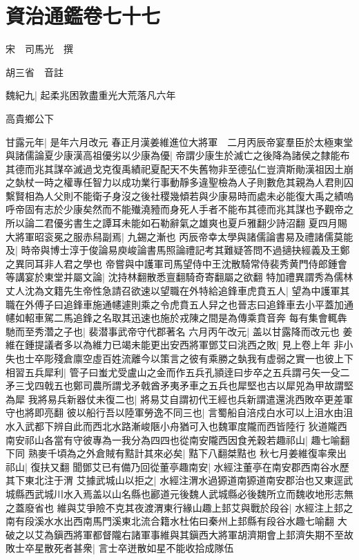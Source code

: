 \chapter{資治通鑑卷七十七}
宋　司馬光　撰

胡三省　音註

魏紀九|{
	起柔兆困敦盡重光大荒落凡六年}


高貴鄉公下

甘露元年|{
	是年六月改元}
春正月漢姜維進位大將軍　二月丙辰帝宴羣臣於太極東堂與諸儒論夏少康漢高祖優劣以少康為優|{
	帝謂少康生於滅亡之後降為諸侯之隸能布其德而兆其謀卒滅過戈克復禹績祀夏配天不失舊物非至德弘仁豈濟斯勛漢祖因土崩之埶杖一時之權專任智力以成功業行事動靜多違聖檢為人子則數危其親為人君則囚繫賢相為人父則不能衛子身沒之後社稷幾傾若與少康易時而處未必能復大禹之績嗚呼帝固有志於少康矣然而不能殱澆豷而身死人手者不能布其德而兆其謀也予觀帝之所以論二君優劣書生之譚耳未能如石勒辭氣之雄爽也夏戶雅翻少詩沼翻}
夏四月賜大將軍昭衮冕之服赤舄副焉|{
	九錫之漸也}
丙辰帝幸太學與諸儒論書易及禮諸儒莫能及|{
	時帝與博士淳于俊論易庾峻論書馬照論禮記考其難疑答問不過擿抉經義及王鄭之異同耳非人君之學也}
帝嘗與中護軍司馬望侍中王沈散騎常侍裴秀黄門侍郎鍾會等講宴於東堂并屬文論|{
	沈持林翻散悉亶翻騎奇寄翻屬之欲翻}
特加禮異謂秀為儒林丈人沈為文籍先生帝性急請召欲速以望職在外特給追鋒車虎賁五人|{
	望為中護軍其職在外傅子曰追鋒車施通幰遽則乘之令虎賁五人舁之也晉志曰追鋒車去小平蓋加通幰如軺車駕二馬追鋒之名取其迅速也施於戎陳之間是為傳乘賁音奔}
每有集會輒犇馳而至秀濳之子也|{
	裴潜事武帝守代郡著名}
六月丙午改元|{
	盖以甘露降而改元也}
姜維在鍾提議者多以為維力已竭未能更出安西將軍鄧艾曰洮西之敗|{
	見上卷上年}
非小失也士卒彫殘倉廪空虛百姓流離今以策言之彼有乘勝之埶我有虚弱之實一也彼上下相習五兵犀利|{
	管子曰蚩尤受盧山之金而作五兵孔頴逹曰步卒之五兵謂弓矢一殳二矛三戈四戟五也鄭司農所謂戈矛戟酋矛夷矛車之五兵也犀堅也古以犀兕為甲故謂堅為犀}
我將易兵新器仗未復二也|{
	將易艾自謂初代王經也兵新謂遣還洮西敗卒更差軍守也將即亮翻}
彼以船行吾以陸軍勞逸不同三也|{
	言蜀船自涪戍白水可以上沮水由沮水入武都下辨自此而西北水路漸峻陿小舟猶可入也魏軍度隴而西皆陸行}
狄道隴西南安祁山各當有守彼專為一我分為四四也從南安隴西因食羌穀若趣祁山|{
	趣七喻翻下同}
熟麥千頃為之外倉賊有黠計其來必矣|{
	黠下八翻桀黠也}
秋七月姜維復率衆出祁山|{
	復扶又翻}
聞鄧艾已有備乃回從董亭趣南安|{
	水經注董亭在南安郡西南谷水歷其下東北注于渭}
艾據武城山以拒之|{
	水經注渭水過獂道南獂道南安郡治也又東逕武城縣西武城川水入焉盖以山名縣也酈道元後魏人武城縣必後魏所立而魏收地形志無之蓋廢省也}
維與艾爭險不克其夜渡渭東行緣山趣上邽艾與戰於段谷|{
	水經注上邽之南有段溪水水出西南馬門溪東北流合籍水杜佑曰秦州上邽縣有段谷水趣七喻翻}
大破之以艾為鎭西將軍都督隴右諸軍事維與其鎭西大將軍胡濟期會上邽濟失期不至故敗士卒星散死者甚衆|{
	言士卒迸散如星不能收拾成隊伍}
